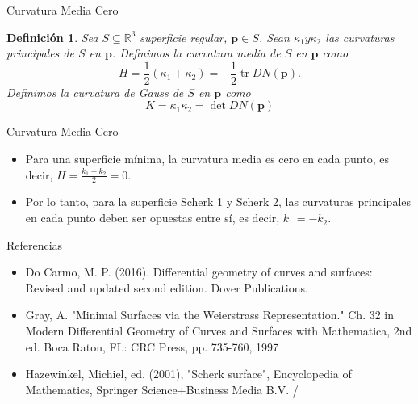 \documentclass[10pt]{beamer}
\newtheorem{definicion}{Definición}
\begin{document}
  \begin{frame}{Curvatura Media Cero}
    \begin{cajita}
      \begin{definicion}
        Sea $S \subseteq \mathbb{R}^3$ superficie regular, $\mathbf{p} \in S$. Sean $\kappa_1 y \kappa_2$ las curvaturas principales de $S$ en $\mathbf{p}$. Definimos la curvatura media de $S$ en $\mathbf{p}$ como
  $$
  H=\frac{1}{2}\left(\kappa_1+\kappa_2\right)=-\frac{1}{2} \operatorname{tr} D N(\mathbf{p}) .
  $$
  Definimos la curvatura de Gauss de $S$ en $\mathbf{p}$ como
  $$
  K=\kappa_1 \kappa_2=\operatorname{det} D N(\mathbf{p})
  $$
      \end{definicion}
    \end{cajita}
    
    
 \end{frame}

 \begin{frame}{Curvatura Media Cero}

  \begin{itemize}
    \item Para una superficie mínima, la curvatura media es cero en cada punto, es decir, $H = \frac{k_1 + k_2}{2} = 0$.
    \item Por lo tanto, para la superficie Scherk 1 y Scherk 2, las curvaturas principales en cada punto deben ser opuestas entre sí, es decir, $k_1 = -k_2$.
\end{itemize}
\end{frame}



 \begin{frame}{Referencias}
  \begin{itemize}
    \item Do Carmo, M. P. (2016). Differential geometry of curves and surfaces: Revised and updated second edition. Dover Publications.
    \item Gray, A. "Minimal Surfaces via the Weierstrass Representation." Ch. 32 in Modern Differential Geometry of Curves and Surfaces with Mathematica, 2nd ed. Boca Raton, FL: CRC Press, pp. 735-760, 1997
    \item Hazewinkel, Michiel, ed. (2001), "Scherk surface", Encyclopedia of Mathematics, Springer Science+Business Media B.V. /
  \end{itemize}
 \end{frame}
\end{document}
